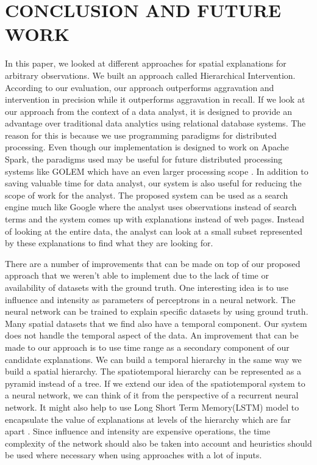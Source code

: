 \section{CONCLUSION AND FUTURE WORK}
\label{chp:concl}
In this paper, we looked at different approaches for spatial explanations for arbitrary observations. We built an approach called Hierarchical Intervention. According to our evaluation, our approach outperforms aggravation and intervention in precision while it outperforms aggravation in recall. If we look at our approach from the context of a data analyst, it is designed to provide an advantage over traditional data analytics using relational database systems. The reason for this is because we use programming paradigms for distributed processing. Even though our implementation is designed to work on Apache Spark, the paradigms used may be useful for future distributed processing systems like GOLEM which have an even larger processing scope \cite{golem2018}. In addition to saving valuable time for data analyst, our system is also useful for reducing the scope of work for the analyst. The proposed system can be used as a search engine much like Google where the analyst uses observations instead of search terms and the system comes up with explanations instead of web pages. Instead of looking at the entire data, the analyst can look at a small subset represented by these explanations to find what they are looking for.

There are a number of improvements that can be made on top of our proposed approach that we weren't able to implement due to the lack of time or availability of datasets with the ground truth. One interesting idea is to use influence and intensity as parameters of perceptrons in a neural network\cite{grossberg1988nonlinear,widrow199030}. The neural network can be trained to explain specific datasets by using ground truth.
Many spatial datasets that we find also have a temporal component. Our system does not handle the temporal aspect of the data. An improvement that can be made to our approach is to use time range as a secondary component of our candidate explanations. We can build a temporal hierarchy in the same way we build a spatial hierarchy. The spatiotemporal hierarchy can be represented as a pyramid instead of a tree.
If we extend our idea of the spatiotemporal system to a neural network, we can think of it from the perspective of a recurrent neural network\cite{chung2016hierarchical}. It might also help to use Long Short Term Memory(LSTM) model to encapsulate the value of explanations at levels of the hierarchy which are far apart \cite{hochreiter1997long}.
Since influence and intensity are expensive operations, the time complexity of the network should also be taken into account and heuristics should be used where necessary when using approaches with a lot of inputs.

